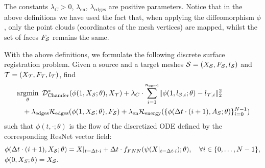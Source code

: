 The constants $\lambda_C>0$, $\lambda_{\text{en}}$, $\lambda_{\text{edges}}$ are positive parameters. Notice that in the above definitions we have used the fact that, when applying the diffeomorphism $\phi$, only the point clouds (coordinates of the mesh vertices) are mapped, whilst the set of faces $F_{\mathcal S}$ remains the same.


\begin{problem}
With the above definitions, we formulate the following discrete surface registration problem. Given a source and a target meshes 
$\mathcal S=(X_{\mathcal S},F_{\mathcal S}, l_{\mathcal S})$ and $\mathcal T = (X_{\mathcal T},F_{\mathcal T}, l_{\mathcal T})$, find 
  \label{def:resnetlddmm}
  \begin{align*}
    &\argmin_{\theta}\ 
    \mathcal{D}_{\text{Chamfer}}^*(\phi(1, \XS; \theta), \XT) + \lambda_C\cdot\sum_{i=1}^{n_{\text{cntrl}}}\lVert \phi(1, l_{\mathcal S, i}; \theta)-l_{\mathcal T, i} \rVert^2_2 \\
  & \quad + 
 \lambda_{\text{edges}} \mathcal{R}_{\text{edges}}(\phi(1, \XS; \theta),\FS) +  \lambda_{\text{en}} \mathcal{R}_{\text{energy}}(\{\phi(\Delta t\cdot (i+1), A_S;\theta)\}_{i=0}^{N-1})\\
  \end{align*}
such that   $\phi(t,\cdot;\theta)$ is the flow of the discretized ODE defined by the corresponding ResNet vector field:
%
\begin{align*}
    &\phi(\Delta t\cdot (i+1), X_{\mathcal S};\theta) = X|_{t=\Delta t\cdot i} + \Delta t\cdot f_{FNN}(\psi(X|_{t=\Delta t\cdot i});\theta),\quad \forall i\in\{0, \dots, N-1\},\\
    &\phi(0, X_S;\theta) = X_{\mathcal S}.
\end{align*}
\end{problem}

